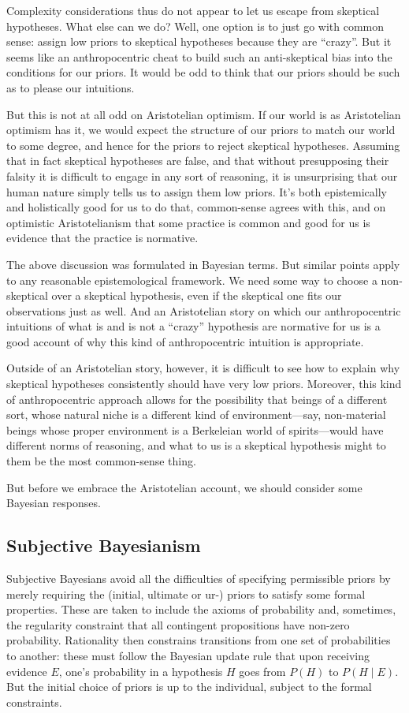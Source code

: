 Complexity considerations thus do not appear to let us escape from skeptical hypotheses. What else can we do? Well, one option is to just
go with common sense: assign low priors to skeptical hypotheses because they are ``crazy''.
But it seems like an anthropocentric cheat to 
build such an anti-skeptical bias into the conditions for our priors. It would be odd to think that our priors should
be such as to please our intuitions.

But this is not at all odd on Aristotelian optimism. If our world is as Aristotelian optimism has it, we would expect
the structure of our priors to match our world to some degree, and hence for the priors to reject skeptical hypotheses. Assuming
that in fact skeptical hypotheses are false, and that without presupposing their falsity it is difficult to engage
in any sort of reasoning, it is unsurprising that our human nature simply tells us to assign them low priors. 
It's both epistemically and holistically good for us to do that, common-sense agrees with this, and on optimistic Aristotelianism that some practice is common and good for us is evidence that the practice is normative.

The above discussion was formulated in Bayesian terms. But similar points apply to any reasonable epistemological framework.
We need some way to choose a non-skeptical over a skeptical hypothesis, even if the skeptical one fits our observations just 
as well. And an Aristotelian story on which our anthropocentric intuitions of what is and is not a ``crazy'' hypothesis 
are normative for us is a good account of why this kind of anthropocentric intuition is appropriate.

Outside of an Aristotelian story, however, it is difficult to see how to explain why
skeptical hypotheses consistently should have very low priors. Moreover, this kind of anthropocentric approach 
allows for the possibility that beings of a different sort, whose natural niche is a different kind of 
environment---say, non-material beings whose proper environment is a Berkeleian world of spirits---would have
different norms of reasoning, and what to us is a skeptical hypothesis might to them be the most common-sense thing.

But before we embrace the Aristotelian account, we should consider some Bayesian responses.

\subsection{Subjective Bayesianism}
Subjective Bayesians avoid all the difficulties of specifying permissible priors by merely
requiring the (initial, ultimate or ur-) priors to satisfy some formal properties. These are taken to include the
axioms of probability and, sometimes, the regularity constraint that all contingent 
propositions have non-zero probability. Rationality then constrains transitions from one
set of probabilities to another: these must follow the Bayesian update rule that upon
receiving evidence $E$, one's probability in a hypothesis $H$ goes from $P(H)$ to 
$P(H\mid E)$. But the initial choice of priors is up to the individual, subject to the
formal constraints.

